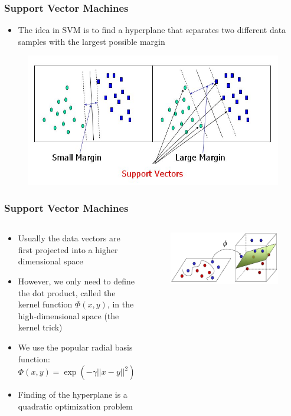 \documentclass[hyperref={pdfpagelabels=false}]{beamer}
\begin{document}
\frame
{
  \frametitle{Support Vector Machines}

  \begin{itemize}
    \item The idea in SVM is to find a hyperplane that separates two different data samples with the largest possible margin 
  \end{itemize}

\begin{figure}
	\centering
	\includegraphics[width=\textwidth]{svm_margin.jpg}
\end{figure}
}

\frame
{
  \frametitle{Support Vector Machines}

\begin{columns}
\begin{column}{7cm}
{\small
  \begin{itemize}
    \item Usually the data vectors are first projected into a higher dimensional space
    \item However, we only need to define the dot product, called the kernel function $\Phi(x,y)$, in the high-dimensional space (the kernel trick)
    \item We use the popular radial basis function: $\Phi(x,y) = \exp(-\gamma||x-y||^2)$
    \item Finding of the hyperplane is a quadratic optimization problem
  \end{itemize}
}
\end{column}
\begin{column}{4.5cm}
\begin{figure}
	\centering
		\includegraphics[width=\textwidth]{svm2.png}
	\label{fig:bridge}
\end{figure}
\end{column}
\end{columns}
}
\end{document}

